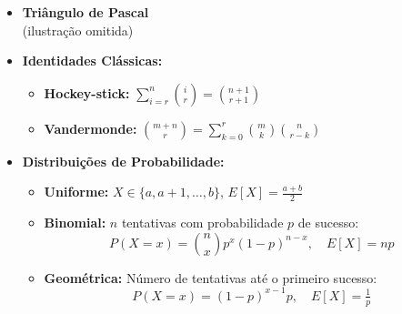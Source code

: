 \documentclass[12pt,a4paper]{article}
\begin{document}
\begin{small}
\begin{itemize}
    \item \textbf{Triângulo de Pascal} \\[0.5ex]
    (ilustração omitida)

    \item \textbf{Identidades Clássicas:}
    \begin{itemize}
        \item \textbf{Hockey-stick:} $\sum_{i=r}^{n} \binom{i}{r} = \binom{n+1}{r+1}$
        \item \textbf{Vandermonde:} $\binom{m+n}{r} = \sum_{k=0}^{r} \binom{m}{k} \binom{n}{r-k}$
    \end{itemize}

    \item \textbf{Distribuições de Probabilidade:}
    \begin{itemize}
        \item \textbf{Uniforme:} $X \in \{a, a+1, \dots, b\}$, \quad $E[X] = \tfrac{a+b}{2}$
        \item \textbf{Binomial:} $n$ tentativas com probabilidade $p$ de sucesso:
        \[
        P(X = x) = \binom{n}{x} p^x (1-p)^{n-x}, \quad E[X] = np
        \]
        \item \textbf{Geométrica:} Número de tentativas até o primeiro sucesso:
        \[
        P(X = x) = (1-p)^{x-1}p, \quad E[X] = \tfrac{1}{p}
        \]
    \end{itemize}

\end{itemize}
\end{small}
\end{document}
